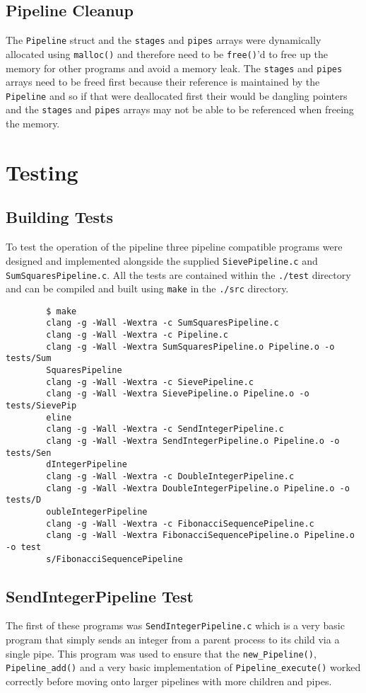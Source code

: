 \documentclass{article}
\begin{document}
    \subsection{Pipeline Cleanup}
    The \verb+Pipeline+ struct and the \verb+stages+ and \verb+pipes+ arrays were dynamically allocated using \verb+malloc()+ and therefore need to be \verb+free()+'d to free up the memory for other programs and avoid a memory leak.
    The \verb+stages+ and \verb+pipes+ arrays need to be freed first because their reference is maintained by the \verb+Pipeline+ and so if that were deallocated first their would be dangling pointers and the \verb+stages+ and \verb+pipes+ arrays may not be able to be referenced when freeing the memory.

    \section{Testing}
    \subsection{Building Tests}
    To test the operation of the pipeline three pipeline compatible programs were designed and implemented alongside the supplied \verb+SievePipeline.c+ and \verb+SumSquaresPipeline.c+.
    All the tests are contained within the \verb+./test+ directory and can be compiled and built using \verb+make+ in the \verb+./src+ directory.

        \begin{verbatim}
        $ make
        clang -g -Wall -Wextra -c SumSquaresPipeline.c
        clang -g -Wall -Wextra -c Pipeline.c
        clang -g -Wall -Wextra SumSquaresPipeline.o Pipeline.o -o tests/Sum
        SquaresPipeline
        clang -g -Wall -Wextra -c SievePipeline.c
        clang -g -Wall -Wextra SievePipeline.o Pipeline.o -o tests/SievePip
        eline
        clang -g -Wall -Wextra -c SendIntegerPipeline.c
        clang -g -Wall -Wextra SendIntegerPipeline.o Pipeline.o -o tests/Sen
        dIntegerPipeline
        clang -g -Wall -Wextra -c DoubleIntegerPipeline.c
        clang -g -Wall -Wextra DoubleIntegerPipeline.o Pipeline.o -o tests/D
        oubleIntegerPipeline
        clang -g -Wall -Wextra -c FibonacciSequencePipeline.c
        clang -g -Wall -Wextra FibonacciSequencePipeline.o Pipeline.o -o test
        s/FibonacciSequencePipeline
        \end{verbatim}

    \subsection{SendIntegerPipeline Test}
    \noindent The first of these programs was \verb+SendIntegerPipeline.c+ which is a very basic program that simply sends an integer from a parent process to its child via a single pipe.
    This program was used to ensure that the \verb+new_Pipeline()+, \verb+Pipeline_add()+ and a very basic implementation of \verb+Pipeline_execute()+ worked correctly before moving onto larger pipelines with more children and pipes.
\end{document}

